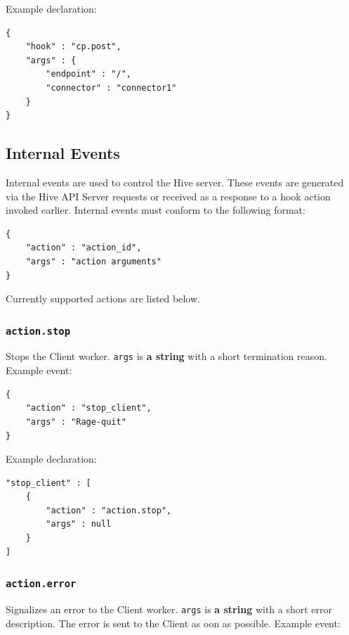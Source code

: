 \documentclass[a4paper]{article}
\begin{document}
\noindent
Example declaration:

\begin{verbatim}
{
    "hook" : "cp.post",
    "args" : {
        "endpoint" : "/",
        "connector" : "connector1"
    }
}
\end{verbatim}
\subsection{Internal Events}
\label{sec-8-3}
\label{ref-internal_events}
\label{ref-hive_events}


Internal events are used to control the Hive server. These events are generated via the Hive API Server requests or received as a response to a hook action invoked earlier. Internal events must conform to the following format:


\begin{verbatim}
{
    "action" : "action_id",
    "args" : "action arguments"
}
\end{verbatim}




\noindent
Currently supported actions are listed below.
\subsubsection{\texttt{action.stop}}
\label{sec-8-3-1}

Stops the Client worker. \texttt{args} is \textbf{a string} with a short termination reason. Example event:


\begin{verbatim}
{
    "action" : "stop_client",
    "args" : "Rage-quit"
}
\end{verbatim}




\noindent
Example declaration:

\begin{verbatim}
"stop_client" : [
    {
        "action" : "action.stop",
        "args" : null
    }
]
\end{verbatim}
\subsubsection{\texttt{action.error}}
\label{sec-8-3-2}

Signalizes an error to the Client worker. \texttt{args} is \textbf{a string} with a short error description. The error is sent to the Client as oon as possible. Example event:
\end{document}
